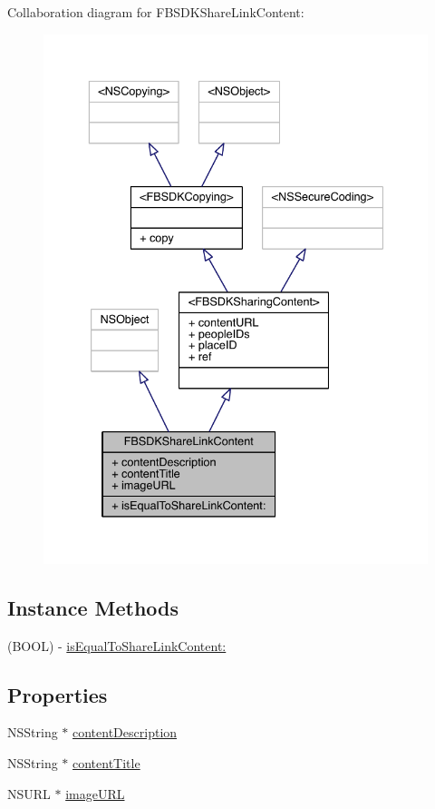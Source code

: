 Collaboration diagram for F\-B\-S\-D\-K\-Share\-Link\-Content\-:
\nopagebreak
\begin{figure}[H]
\begin{center}
\leavevmode
\includegraphics[width=336pt]{interface_f_b_s_d_k_share_link_content__coll__graph}
\end{center}
\end{figure}
\subsection*{Instance Methods}
\begin{DoxyCompactItemize}
\item 
(B\-O\-O\-L) -\/ \hyperlink{interface_f_b_s_d_k_share_link_content_a8f34990c56f670c00c01a4a92c09b35c}{is\-Equal\-To\-Share\-Link\-Content\-:}
\end{DoxyCompactItemize}
\subsection*{Properties}
\begin{DoxyCompactItemize}
\item 
N\-S\-String $\ast$ \hyperlink{interface_f_b_s_d_k_share_link_content_a1fef92d83f1e0a9f51c0923fd820ec41}{content\-Description}
\item 
N\-S\-String $\ast$ \hyperlink{interface_f_b_s_d_k_share_link_content_acad99ec961a251713ec7118356ed6a2a}{content\-Title}
\item 
N\-S\-U\-R\-L $\ast$ \hyperlink{interface_f_b_s_d_k_share_link_content_a7eb946e85589c6436ed65bf8f4166172}{image\-U\-R\-L}
\end{DoxyCompactItemize}



